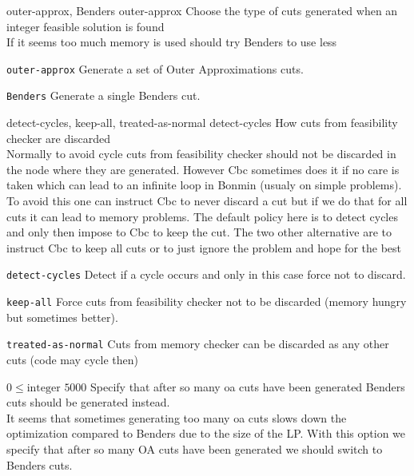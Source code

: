 %
{\ttfamily outer-approx, Benders}%
{outer-approx}%
{Choose the type of cuts generated when an integer feasible solution is found\\
If it seems too much memory is used should try Benders to use less}%
{\begin{list}{}{
\setlength{\parsep}{0em}
\setlength{\leftmargin}{5ex}
\setlength{\labelwidth}{2ex}
\setlength{\itemindent}{0ex}
\setlength{\topsep}{0pt}}
\item[\texttt{outer-approx}] Generate a set of Outer Approximations cuts.
\item[\texttt{Benders}] Generate a single Benders cut.
\end{list}
}

%
{\ttfamily detect-cycles, keep-all, treated-as-normal}%
{detect-cycles}%
{How cuts from feasibility checker are discarded\\
Normally to avoid cycle cuts from feasibility checker should not be discarded in the node where they are generated. However Cbc sometimes does it if no care is taken which can lead to an infinite loop in Bonmin (usualy on simple problems). To avoid this one can instruct Cbc to never discard a cut but if we do that for all cuts it can lead to memory problems. The default policy here is to detect cycles and only then impose to Cbc to keep the cut. The two other alternative are to instruct Cbc to keep all cuts or to just ignore the problem and hope for the best}%
{\begin{list}{}{
\setlength{\parsep}{0em}
\setlength{\leftmargin}{5ex}
\setlength{\labelwidth}{2ex}
\setlength{\itemindent}{0ex}
\setlength{\topsep}{0pt}}
\item[\texttt{detect-cycles}] Detect if a cycle occurs and only in this case force not to discard.
\item[\texttt{keep-all}] Force cuts from feasibility checker not to be discarded (memory hungry but sometimes better).
\item[\texttt{treated-as-normal}] Cuts from memory checker can be discarded as any other cuts (code may cycle then)
\end{list}
}

%
{$0\leq\textrm{integer}$}%
{$5000$}%
{Specify that after so many oa cuts have been generated Benders cuts should be generated instead.\\
It seems that sometimes generating too many oa cuts slows down the optimization compared to Benders due to the size of the LP. With this option we specify that after so many OA cuts have been generated we should switch to Benders cuts.}%
{}

